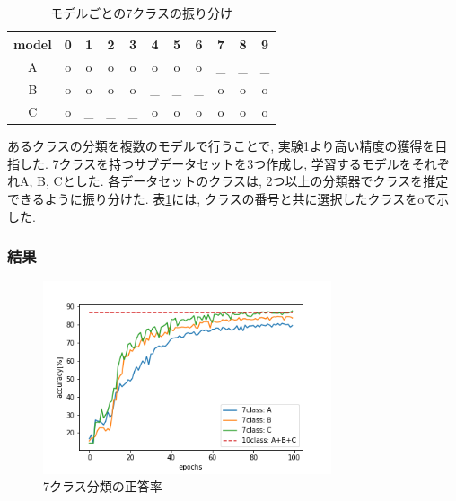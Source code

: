\documentclass[twocolumn]{jarticle}     %
\begin{document}
\begin{table}[tb]
  \begin{center}
    \caption{モデルごとの7クラスの振り分け}
    \begin{tabular}{|c||c|c|c|c|c|c|c|c|c|c|} \hline
      model & 0 & 1 & 2 & 3 & 4 & 5 & 6 & 7 & 8 & 9 \\ \hline\hline
      A     & o & o & o & o & o & o & o & _ & _ & _ \\ \hline
      B     & o & o & o & o & _ & _ & _ & o & o & o \\ \hline
      C     & o & _ & _ & _ & o & o & o & o & o & o \\ \hline
    \end{tabular}
    \label{tab:class7}
  \end{center}
\end{table}

あるクラスの分類を複数のモデルで行うことで, 実験1より高い精度の獲得を目指した.
7クラスを持つサブデータセットを3つ作成し, 学習するモデルをそれぞれA, B, Cとした.
各データセットのクラスは, 2つ以上の分類器でクラスを推定できるように振り分けた.
表\ref{tab:class7}には, クラスの番号と共に選択したクラスをoで示した.

\subsubsection{結果}

\begin{figure}[tb]
	\begin{center}
		\includegraphics[clip,width=8.5cm]{accuracy7.png}
		\caption{7クラス分類の正答率}
		\label{fig:accuracy7}
	\end{center}
\end{figure}
\end{document}
